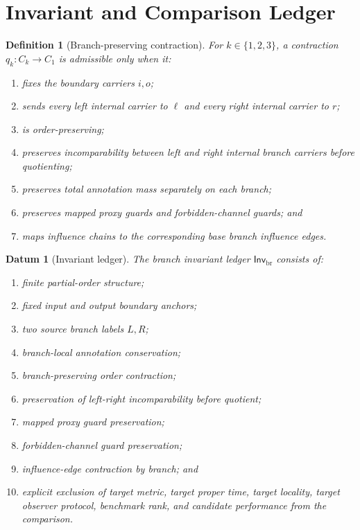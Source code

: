 \documentclass[11pt]{article}
\newcommand{\InvBr}{\mathsf{Inv}_{\mathrm{br}}}
\newtheorem{definitionblock}{Definition}
\newtheorem{datum}{Datum}
\begin{document}
\section{Invariant and Comparison Ledger}

\begin{definitionblock}[Branch-preserving contraction]
For \(k\in\{1,2,3\}\), a contraction \(q_{k}:C_{k}\to C_{1}\) is
admissible only when it:
\begin{enumerate}
    \item fixes the boundary carriers \(i,o\);
    \item sends every left internal carrier to \(\ell\) and every right
    internal carrier to \(r\);
    \item is order-preserving;
    \item preserves incomparability between left and right internal
    branch carriers before quotienting;
    \item preserves total annotation mass separately on each branch;
    \item preserves mapped proxy guards and forbidden-channel guards; and
    \item maps influence chains to the corresponding base branch
    influence edges.
\end{enumerate}
\end{definitionblock}

\begin{datum}[Invariant ledger]
The branch invariant ledger \(\InvBr\) consists of:
\begin{enumerate}
    \item finite partial-order structure;
    \item fixed input and output boundary anchors;
    \item two source branch labels \(L,R\);
    \item branch-local annotation conservation;
    \item branch-preserving order contraction;
    \item preservation of left-right incomparability before quotient;
    \item mapped proxy guard preservation;
    \item forbidden-channel guard preservation;
    \item influence-edge contraction by branch; and
    \item explicit exclusion of target metric, target proper time, target
    locality, target observer protocol, benchmark rank, and candidate
    performance from the comparison.
\end{enumerate}
\end{datum}
\end{document}
